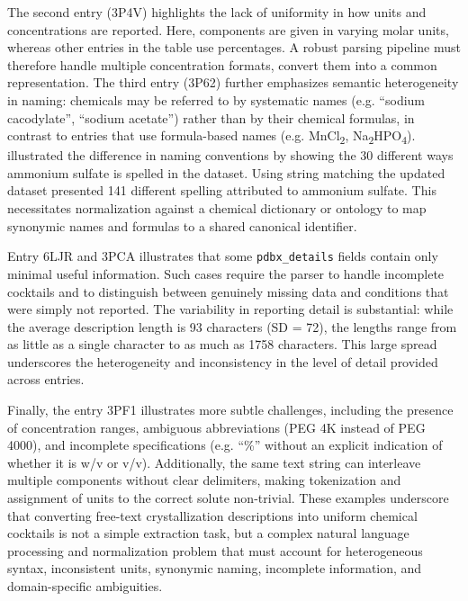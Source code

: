 The second entry (3P4V) highlights the lack of uniformity in how units and concentrations are reported. Here, components are given in varying molar units, whereas other entries in the table use percentages. A robust parsing pipeline must therefore handle multiple concentration formats, convert them into a common representation. The third entry (3P62) further emphasizes semantic heterogeneity in naming: chemicals may be referred to by systematic names (e.g. “sodium cacodylate”, “sodium acetate”) rather than by their chemical formulas, in contrast to entries that use formula-based names (e.g. MnCl\textsubscript{2}, Na\textsubscript{2}HPO\textsubscript{4}). \textcite{Peat2005} illustrated the difference in naming conventions by showing the 30 different ways ammonium sulfate is spelled in the dataset. Using string matching the updated dataset presented 141 different spelling attributed to ammonium sulfate. This necessitates normalization against a chemical dictionary or ontology to map synonymic names and formulas to a shared canonical identifier.

Entry 6LJR and 3PCA illustrates that some \texttt{pdbx\_details} fields contain only minimal useful information. Such cases require the parser to handle incomplete cocktails and to distinguish between genuinely missing data and conditions that were simply not reported. The variability in reporting detail is substantial: while the average description length is 93 characters (SD = 72), the lengths range from as little as a single character to as much as 1758 characters. This large spread underscores the heterogeneity and inconsistency in the level of detail provided across entries. 

Finally, the entry 3PF1 illustrates more subtle challenges, including the presence of concentration ranges, ambiguous abbreviations (PEG 4K instead of PEG 4000), and incomplete specifications (e.g. “\%” without an explicit indication of whether it is w/v or v/v). Additionally, the same text string can interleave multiple components without clear delimiters, making tokenization and assignment of units to the correct solute non-trivial. These examples underscore that converting free-text crystallization descriptions into uniform chemical cocktails is not a simple extraction task, but a complex natural language processing and normalization problem that must account for heterogeneous syntax, inconsistent units, synonymic naming, incomplete information, and domain-specific ambiguities.



